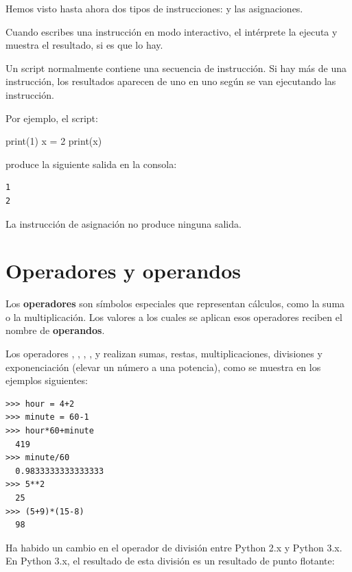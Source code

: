Hemos visto hasta ahora dos tipos de instrucciones:  y las asignaciones.
  

Cuando escribes una instrucción en modo interactivo, el intérprete la
ejecuta y muestra el resultado, si es que lo hay.

Un script normalmente contiene una secuencia de instrucción. Si hay más
de una instrucción, los resultados aparecen de uno en uno según se van
ejecutando las instrucción.

Por ejemplo, el script:

\begin{python}[frame=single]
print(1)
x = 2
print(x)
\end{python}

produce la siguiente salida en la consola:

\begin{verbatim}
1
2
\end{verbatim}

La instrucción de asignación no produce ninguna salida.

\hypertarget{operadores-y-operandos}{%
\section{Operadores y operandos}\label{operadores-y-operandos}}

 
 

\begin{definition}
Los \textbf{operadores} son símbolos especiales que representan cálculos,
como la suma o la multiplicación. Los valores a los cuales se aplican
esos operadores reciben el nombre de \textbf{operandos}.
\end{definition}

Los operadores \pythoninline{+}, \pythoninline{-}, \pythoninline{*} , \pythoninline{/}, y \pythoninline{**}
realizan sumas, restas, multiplicaciones, divisiones y exponenciación
(elevar un número a una potencia), como se muestra en los ejemplos
siguientes:

\begin{Verbatim}[frame=single]
>>> hour = 4+2
>>> minute = 60-1
>>> hour*60+minute
  419
>>> minute/60
  0.9833333333333333
>>> 5**2
  25
>>> (5+9)*(15-8)
  98
\end{Verbatim}

Ha habido un cambio en el operador de división entre Python 2.x y Python
3.x. En Python 3.x, el resultado de esta división es un resultado de
punto flotante:

